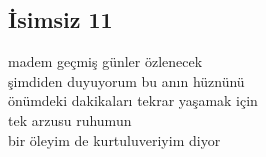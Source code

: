 \subsection{İsimsiz 11}

madem geçmiş günler özlenecek \\
şimdiden duyuyorum bu anın hüznünü \\
önümdeki dakikaları tekrar yaşamak için \\
tek arzusu ruhumun \\
bir öleyim de kurtuluveriyim diyor \\